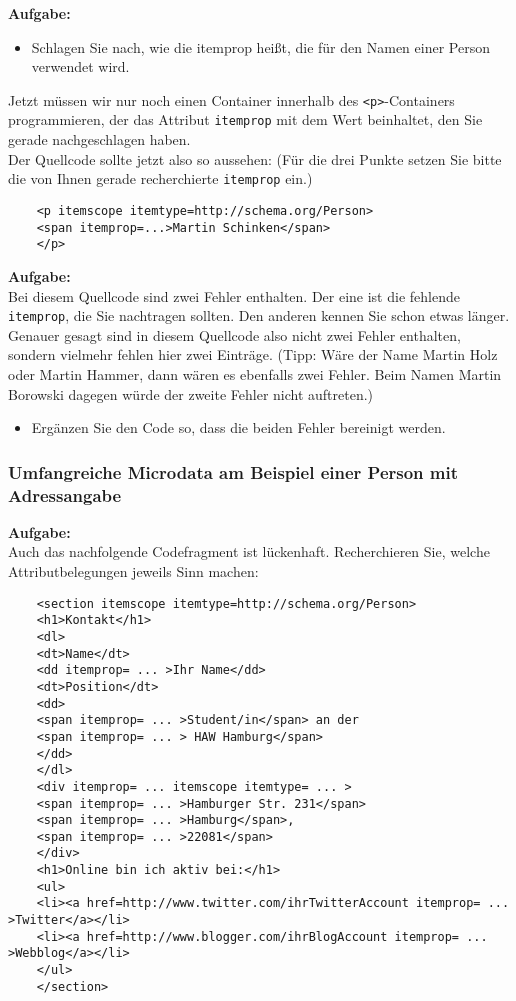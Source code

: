 \textbf{Aufgabe:}

\begin{itemize}
	\item Schlagen Sie nach, wie die itemprop heißt, die für den Namen einer Person verwendet wird.
\end{itemize}

Jetzt müssen wir nur noch einen Container innerhalb des \verb|<p>|-Containers programmieren, der das Attribut \verb|itemprop| mit dem Wert beinhaltet, den Sie gerade nachgeschlagen haben. \\

Der Quellcode sollte jetzt also so aussehen: (Für die drei Punkte setzen Sie bitte die von Ihnen gerade recherchierte \verb|itemprop| ein.)

\begin{verbatim}
	<p itemscope itemtype=http://schema.org/Person>
	<span itemprop=...>Martin Schinken</span>
	</p>
\end{verbatim}

\textbf{Aufgabe:}\\

Bei diesem Quellcode sind zwei Fehler enthalten. Der eine ist die fehlende \verb|itemprop|, die Sie nachtragen sollten. Den anderen kennen Sie schon etwas länger. Genauer gesagt sind in diesem Quellcode also nicht zwei Fehler enthalten, sondern vielmehr fehlen hier zwei Einträge. (Tipp: Wäre der Name Martin Holz oder Martin Hammer, dann wären es ebenfalls zwei Fehler. Beim Namen Martin Borowski dagegen würde der zweite Fehler nicht auftreten.)

\begin{itemize}
	\item Ergänzen Sie den Code so, dass die beiden Fehler bereinigt werden.
\end{itemize}

\subsubsection{Umfangreiche Microdata am Beispiel einer Person mit Adressangabe}

\textbf{Aufgabe:}\\

Auch das nachfolgende Codefragment ist lückenhaft. Recherchieren Sie, welche Attributbelegungen jeweils Sinn machen:

\begin{verbatim}
	<section itemscope itemtype=http://schema.org/Person>
	<h1>Kontakt</h1>
	<dl>
	<dt>Name</dt>
	<dd itemprop= ... >Ihr Name</dd>
	<dt>Position</dt>
	<dd>
	<span itemprop= ... >Student/in</span> an der
	<span itemprop= ... > HAW Hamburg</span>
	</dd>
	</dl>
	<div itemprop= ... itemscope itemtype= ... >
	<span itemprop= ... >Hamburger Str. 231</span>
	<span itemprop= ... >Hamburg</span>,
	<span itemprop= ... >22081</span>
	</div>
	<h1>Online bin ich aktiv bei:</h1>
	<ul>
	<li><a href=http://www.twitter.com/ihrTwitterAccount itemprop= ... >Twitter</a></li>
	<li><a href=http://www.blogger.com/ihrBlogAccount itemprop= ... >Webblog</a></li>
	</ul>
	</section>
\end{verbatim}

